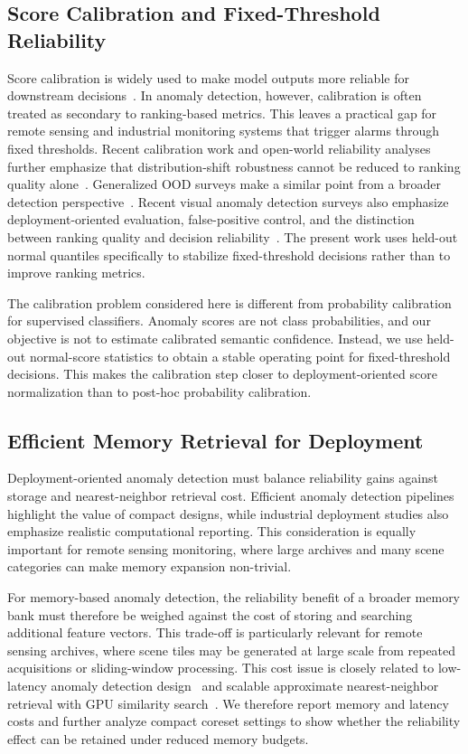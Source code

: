 \documentclass[remotesensing,article,submit,pdftex,moreauthors]{Definitions/mdpi}
\begin{document}
\subsection{Score Calibration and Fixed-Threshold Reliability}
Score calibration is widely used to make model outputs more reliable for downstream decisions~\cite{calibrationnn}. In anomaly detection, however, calibration is often treated as secondary to ranking-based metrics. This leaves a practical gap for remote sensing and industrial monitoring systems that trigger alarms through fixed thresholds. Recent calibration work and open-world reliability analyses further emphasize that distribution-shift robustness cannot be reduced to ranking quality alone~\cite{recalibmodern,openrealworld}. Generalized OOD surveys make a similar point from a broader detection perspective~\cite{genoodsurvey}. Recent visual anomaly detection surveys also emphasize deployment-oriented evaluation, false-positive control, and the distinction between ranking quality and decision reliability~\cite{vadsurvey}. The present work uses held-out normal quantiles specifically to stabilize fixed-threshold decisions rather than to improve ranking metrics.

The calibration problem considered here is different from probability calibration for supervised classifiers. Anomaly scores are not class probabilities, and our objective is not to estimate calibrated semantic confidence. Instead, we use held-out normal-score statistics to obtain a stable operating point for fixed-threshold decisions. This makes the calibration step closer to deployment-oriented score normalization than to post-hoc probability calibration.

\subsection{Efficient Memory Retrieval for Deployment}
Deployment-oriented anomaly detection must balance reliability gains against storage and nearest-neighbor retrieval cost. Efficient anomaly detection pipelines highlight the value of compact designs, while industrial deployment studies also emphasize realistic computational reporting. This consideration is equally important for remote sensing monitoring, where large archives and many scene categories can make memory expansion non-trivial.

For memory-based anomaly detection, the reliability benefit of a broader memory bank must therefore be weighed against the cost of storing and searching additional feature vectors. This trade-off is particularly relevant for remote sensing archives, where scene tiles may be generated at large scale from repeated acquisitions or sliding-window processing. This cost issue is closely related to low-latency anomaly detection design~\cite{efficientad} and scalable approximate nearest-neighbor retrieval with GPU similarity search~\cite{faiss}. We therefore report memory and latency costs and further analyze compact coreset settings to show whether the reliability effect can be retained under reduced memory budgets.
\end{document}
